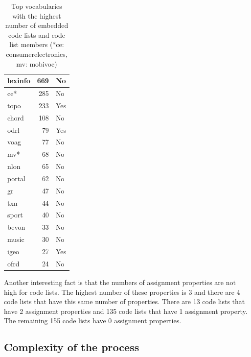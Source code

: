 \begin{table}[h]
\begin{tabular}{|l|r|l|}
lexinfo         & 669            & No     \\ \hline
ce*             & 285            & No     \\ \hline
topo            & 233            & Yes    \\ \hline
chord           & 108            & No     \\ \hline
odrl            & 79             & Yes    \\ \hline
voag            & 77             & No     \\ \hline
mv*             & 68             & No     \\ \hline
nlon            & 65             & No     \\ \hline
portal          & 62             & No     \\ \hline
gr              & 47             & No     \\ \hline
txn             & 44             & No     \\ \hline
sport           & 40             & No     \\ \hline
bevon           & 33             & No     \\ \hline
music           & 30             & No     \\ \hline
igeo            & 27             & Yes    \\ \hline
ofrd            & 24             & No     \\ \hline
\end{tabular}
\centering
\caption{Top vocabularies with the highest number of embedded code lists and code list members (*ce: consumerelectronics, mv: mobivoc)}
\label{tab:top-codes} 
\end{table}

Another interesting fact is that the numbers of assignment properties are not high for code lists. The highest number of these properties is 3 and there are 4 code lists that have this same number of properties. There are 13 code lists that have 2 assignment properties and 135 code lists that have 1 assignment property. The remaining 155 code lists have 0 assignment properties.

\subsection{Complexity of the process}

